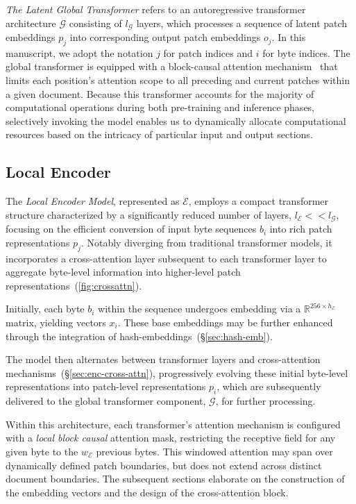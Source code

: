 \textit{The Latent Global Transformer} refers to an autoregressive transformer architecture $\mathcal{G}$ consisting of $l_{\mathcal{G}}$ layers, which processes a sequence of latent patch embeddings $p_j$ into corresponding output patch embeddings $o_j$. In this manuscript, we adopt the notation $j$ for patch indices and $i$ for byte indices. The global transformer is equipped with a block-causal attention mechanism~\citep{dubey2024llama} that limits each position’s attention scope to all preceding and current patches within a given document. Because this transformer accounts for the majority of computational operations during both pre-training and inference phases, selectively invoking the model enables us to dynamically allocate computational resources based on the intricacy of particular input and output sections.

\subsection{Local Encoder}
\label{section:local}

The \textit{Local Encoder Model}, represented as $\mathcal{E}$, employs a compact transformer structure characterized by a significantly reduced number of layers, $l_{\mathcal{E}} << l_{\mathcal{G}}$, focusing on the efficient conversion of input byte sequences $b_i$ into rich patch representations $p_j$. Notably diverging from traditional transformer models, it incorporates a cross-attention layer subsequent to each transformer layer to aggregate byte-level information into higher-level patch representations~(\autoref{fig:crossattn}).

Initially, each byte $b_i$ within the sequence undergoes embedding via a $\mathbb{R}^{256 \times h_{\mathcal{E}}}$ matrix, yielding vectors $x_i$. These base embeddings may be further enhanced through the integration of hash-embeddings~(\S\ref{sec:hash-emb}). 

The model then alternates between transformer layers and cross-attention mechanisms~(\S\ref{sec:enc-cross-attn}), progressively evolving these initial byte-level representations into patch-level representations $p_i$, which are subsequently delivered to the global transformer component, $\mathcal{G}$, for further processing.

Within this architecture, each transformer's attention mechanism is configured with a \textit{local block causal} attention mask, restricting the receptive field for any given byte to the $w_{\mathcal{E}}$ previous bytes. This windowed attention may span over dynamically defined patch boundaries, but does not extend across distinct document boundaries. The subsequent sections elaborate on the construction of the embedding vectors and the design of the cross-attention block.


